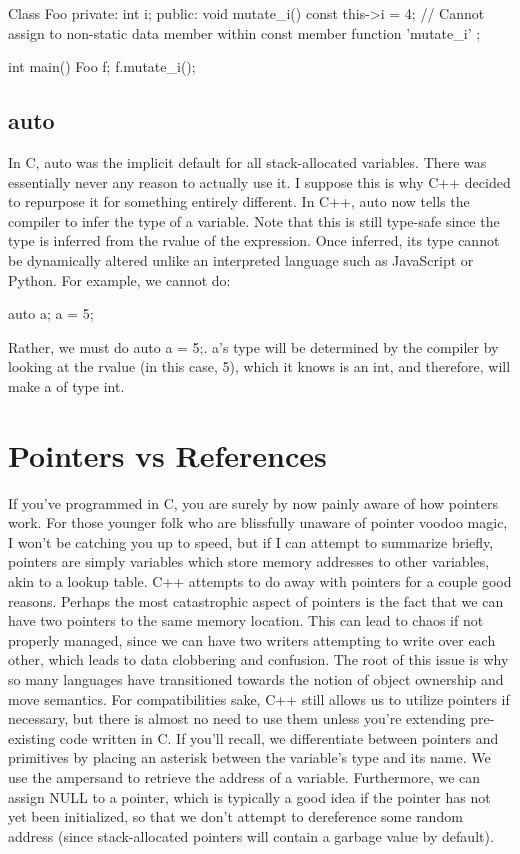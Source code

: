 \documentclass{article}
\begin{document}
\begin{cpplst}
Class Foo {
private:
    int i;
public:
    void mutate_i() const {
        this->i = 4; // Cannot assign to non-static data member within const member function 'mutate_i'
    }
};

int main() {
    Foo f;
    f.mutate_i();
}
\end{cpplst}

\subsection{auto}

In C, auto was the implicit default for all stack-allocated variables. There was essentially never any reason
to actually use it. I suppose this is why C++ decided to repurpose it for something entirely different. In
C++, auto now tells the compiler to infer the type of a variable. Note that this is still type-safe since the
type is inferred from the rvalue of the expression. Once inferred, its type cannot be dynamically altered unlike
an interpreted language such as JavaScript or Python. For example, we cannot do:

\begin{cpplst}
auto a;
a = 5;
\end{cpplst}

Rather, we must do auto a = 5;. a's type will be determined by the compiler by looking at the rvalue (in this
case, 5), which it knows is an int, and therefore, will make a of type int.

\section{Pointers vs References}

If you've programmed in C, you are surely by now painly aware of how pointers work. For those younger folk who
are blissfully unaware of pointer voodoo magic, I won't be catching you up to speed, but if I can attempt to
summarize briefly, pointers are simply variables which store memory addresses to other variables, akin to a
lookup table. C++ attempts to do away with pointers for a couple good reasons. Perhaps the most catastrophic
aspect of pointers is the fact that we can have two pointers to the same memory location. This can lead to
chaos if not properly managed, since we can have two writers attempting to write over each other, which leads
to data clobbering and confusion. The root of this issue is why so many languages have transitioned towards
the notion of object ownership and move semantics. For compatibilities sake, C++ still allows us to utilize
pointers if necessary, but there is almost no need to use them unless you're extending pre-existing code
written in C. If you'll recall, we differentiate between pointers and primitives by placing an asterisk between
the variable's type and its name. We use the ampersand to retrieve the address of a variable. Furthermore, we
can assign NULL to a pointer, which is typically a good idea if the pointer has not yet been initialized, so
that we don't attempt to dereference some random address (since stack-allocated pointers will contain a
garbage value by default).
\end{document}
